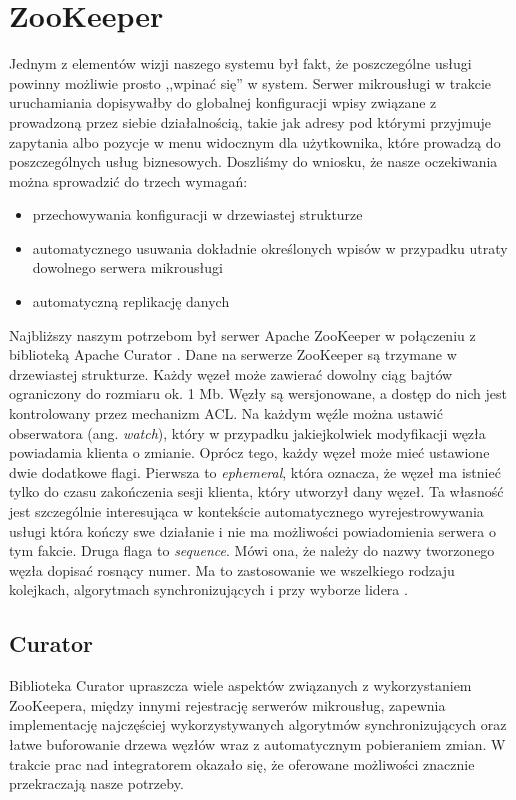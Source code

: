 \documentclass[licencjacka]{pracamgr}
\begin{document}
\section{ZooKeeper}

Jednym z elementów wizji naszego systemu był fakt, że poszczególne usługi
powinny możliwie prosto ,,wpinać się'' w system. Serwer mikrousługi w trakcie
uruchamiania dopisywałby do globalnej konfiguracji wpisy związane z prowadzoną
przez siebie działalnością, takie jak adresy pod którymi przyjmuje zapytania
albo pozycje w menu widocznym dla użytkownika, które prowadzą do poszczególnych
usług biznesowych. Doszliśmy do wniosku, że nasze oczekiwania można sprowadzić
do trzech wymagań:
\begin{itemize}
	\item przechowywania konfiguracji w drzewiastej strukturze
	\item automatycznego usuwania dokładnie określonych wpisów w przypadku
	utraty dowolnego serwera mikrousługi
	\item automatyczną replikację danych
\end{itemize}

Najbliższy naszym potrzebom był serwer Apache ZooKeeper \cite{zookeeper} w
połączeniu z biblioteką Apache Curator \cite{curator}. Dane na serwerze
ZooKeeper są trzymane w drzewiastej strukturze. Każdy węzeł może zawierać dowolny
ciąg bajtów ograniczony do rozmiaru ok. 1 Mb. Węzły są wersjonowane, a dostęp
do nich jest kontrolowany przez mechanizm ACL. Na każdym węźle można ustawić
obserwatora (ang. \textit{watch}), który w przypadku jakiejkolwiek modyfikacji
węzła powiadamia klienta o zmianie. Oprócz tego, każdy węzeł może mieć ustawione
dwie dodatkowe flagi. Pierwsza to \textit{ephemeral}, która oznacza, że węzeł ma
istnieć tylko do czasu zakończenia sesji klienta, który utworzył dany węzeł.
Ta własność jest szczególnie interesująca w kontekście automatycznego
wyrejestrowywania usługi która kończy swe działanie i nie ma możliwości
powiadomienia serwera o tym fakcie. Druga flaga to \textit{sequence}. Mówi ona,
że należy do nazwy tworzonego węzła dopisać rosnący numer. Ma to zastosowanie we
wszelkiego rodzaju kolejkach, algorytmach synchronizujących i przy wyborze
lidera \cite{curatorlock}.

\subsection{Curator}

Biblioteka Curator upraszcza wiele aspektów związanych
z wykorzystaniem ZooKeepera, między innymi rejestrację serwerów mikrousług,
zapewnia implementację najczęściej wykorzystywanych algorytmów synchronizujących
oraz łatwe buforowanie drzewa węzłów wraz z automatycznym pobieraniem zmian. W
trakcie prac nad integratorem okazało się, że oferowane możliwości znacznie przekraczają
nasze potrzeby.
\end{document}
